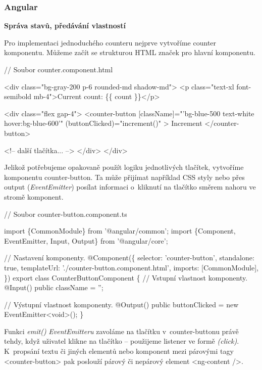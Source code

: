 \subsubsection{Angular}

\begin{flushleft}
  \textbf{Správa stavů, předávání vlastností}
\end{flushleft}

Pro implementaci jednoduchého counteru nejprve vytvoříme counter komponentu. Můžeme začít se strukturou HTML značek pro hlavní komponentu.

\begin{prog}
// Soubor counter.component.html

<div class="bg-gray-200 p-6 rounded-md shadow-md">
  <p class="text-xl font-semibold mb-4">Current count: \{\{ count \}\}</p>

  <div class="flex gap-4">
    <counter-button
      [className]="'bg-blue-500 text-white hover:bg-blue-600'"
      (buttonClicked)="increment()"
    >
      Increment
    </counter-button>

    <!-- další tlačítka... -->
  </div>
</div>
\end{prog}

Jelikož potřebujeme opakovaně použít logiku jednotlivých tlačítek, vytvoříme komponentu counter-button. 
Ta může přijímat například CSS styly nebo přes output (\emph{EventEmitter}) posílat informaci o~kliknutí na tlačítko směrem nahoru ve stromě komponent.

\begin{prog}
// Soubor counter-button.component.ts

import \{CommonModule\} from '@angular/common';
import \{Component, EventEmitter, Input, Output\} from '@angular/core';

// Nastavení komponenty.
@Component(\{
  selector: 'counter-button',
  standalone: true,
  templateUrl: './counter-button.component.html',
  imports: [CommonModule],
\})
export class CounterButtonComponent \{
  // Vstupní vlastnost komponenty.
  @Input() public className = '';

  // Výstupní vlastnost komponenty.
  @Output() public buttonClicked = new EventEmitter<void>();
\}
\end{prog}

Funkci \emph{emit()} \emph{EventEmitteru} zavoláme na tlačítku v~counter-buttonu právě tehdy, když uživatel klikne na tlačítko -- použijeme listener ve formě \emph{(click)}. 
K~propsání textu či jiných elementů nebo komponent mezi párovými tagy <counter-button> pak poslouží párový či nepárový element <ng-content />.

